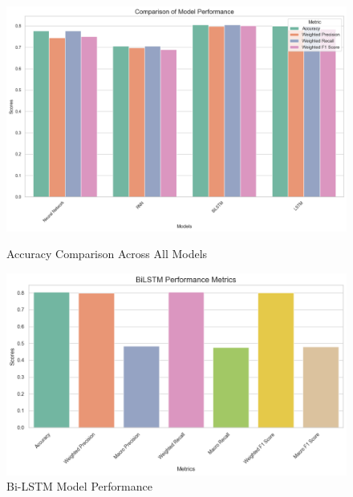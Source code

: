 \begin{figure}[H]
	\centering
	\begin{minipage}{0.48\textwidth}
		\centering
		\includegraphics[width=\linewidth]{img/paper_2/Comparision Plot.png}
		\caption{Accuracy Comparison Across All Models}
		\label{fig:accuracy_comparison}
	\end{minipage}
	\hfill
	\begin{minipage}{0.48\textwidth}
		\centering
		\includegraphics[width=\linewidth]{img/paper_2/BILSTM.png}
		\caption{Bi-LSTM Model Performance}
		\label{fig:bilstm_performance}
	\end{minipage}
	
	\vspace{0.5cm}
	

\end{figure}
